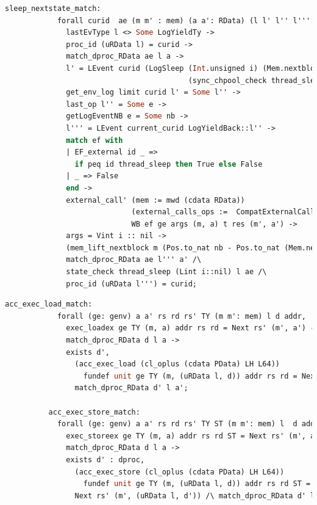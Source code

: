 \begin{lstlisting}[language=Caml]
          sleep_nextstate_match:
            forall curid  ae (m m' : mem) (a a': RData) (l l' l'' l''': Log) e nb WB ef (ge : genv) args m t res i,
              lastEvType l <> Some LogYieldTy ->
              proc_id (uRData l) = curid ->
              match_dproc_RData ae l a ->
              l' = LEvent curid (LogSleep (Int.unsigned i) (Mem.nextblock m)
                                          (sync_chpool_check thread_sleep (Lint i::nil) (uRData l) ae))::l ->
              get_env_log limit curid l' = Some l'' ->
              last_op l'' = Some e ->
              getLogEventNB e = Some nb -> 
              l''' = LEvent current_curid LogYieldBack::l'' ->
              match ef with 
              | EF_external id _ =>
                if peq id thread_sleep then True else False 
              | _ => False
              end ->
              external_call' (mem := mwd (cdata RData)) 
                             (external_calls_ops :=  CompatExternalCalls.compatlayer_extcall_ops (phthread <@$\oplus$@>  L64))
                             WB ef ge args (m, a) t res (m', a') ->
              args = Vint i :: nil ->
              (mem_lift_nextblock m (Pos.to_nat nb - Pos.to_nat (Mem.nextblock m)) = m') /\
              match_dproc_RData ae l''' a' /\
              state_check thread_sleep (Lint i::nil) l ae /\
              proc_id (uRData l''') = curid;
\end{lstlisting}

\begin{lstlisting}[language=Caml]
          acc_exec_load_match:
            forall (ge: genv) a a' rs rd rs' TY (m m': mem) l d addr,
              exec_loadex ge TY (m, a) addr rs rd = Next rs' (m', a') ->
              match_dproc_RData d l a ->
              exists d',
                (acc_exec_load (cl_oplus (cdata PData) LH L64)) 
                  fundef unit ge TY (m, (uRData l, d)) addr rs rd = Next rs' (m', (uRData l, d')) /\
                match_dproc_RData d' l a';

          acc_exec_store_match:
            forall (ge: genv) a a' rs rd rs' TY ST (m m': mem) l  d addr,           
              exec_storeex ge TY (m, a) addr rs rd ST = Next rs' (m', a') ->
              match_dproc_RData d l a ->
              exists d' : dproc,
                (acc_exec_store (cl_oplus (cdata PData) LH L64)) 
                  fundef unit ge TY (m, (uRData l, d)) addr rs rd ST =
                Next rs' (m', (uRData l, d')) /\ match_dproc_RData d' l a';
\end{lstlisting}

